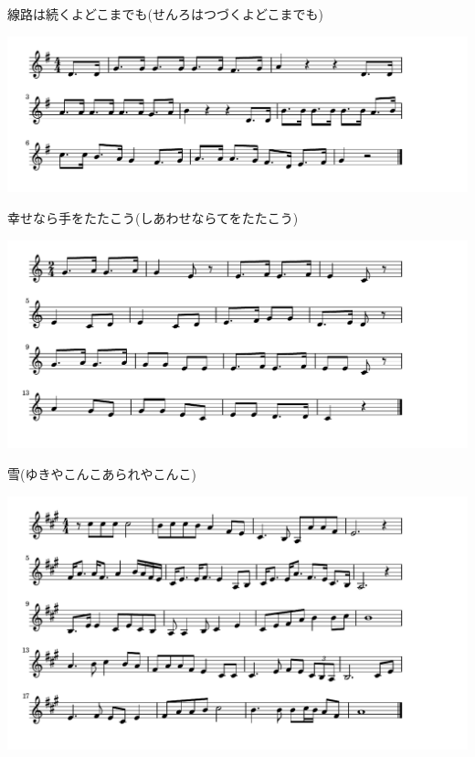 \documentclass[a4paper]{ltjsarticle}
\begin{document}
\vspace{-10mm} \hspace{10mm}
線路は続くよどこまでも(せんろはつづくよどこまでも)

\includegraphics[clip]{shiawasenara_crop.pdf}

\vspace{-10mm} \hspace{10mm}
幸せなら手をたたこう(しあわせならてをたたこう)


\includegraphics[clip]{yukiyakonko_crop.pdf}

\vspace{-10mm} \hspace{10mm}
雪(ゆきやこんこあられやこんこ)

\includegraphics[clip]{kitaguninoharu_crop.pdf}
\end{document}
